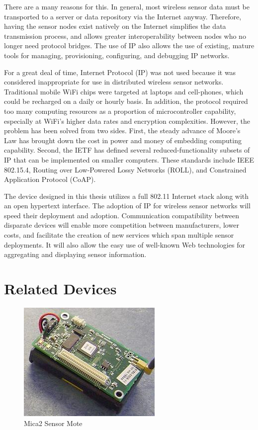 There are a many reasons for this. In general, most wireless sensor data must be transported to a server or data repository via the Internet anyway. Therefore, having the sensor nodes exist natively on the Internet simplifies the data transmission process, and allows greater interoperability between nodes who no longer need protocol bridges. The use of IP also allows the use of existing, mature tools for managing, provisioning, configuring, and debugging IP networks.  

For a great deal of time, Internet Protocol (IP) was not used because it was considered inappropriate for use in distributed wireless sensor networks. Traditional mobile WiFi chips were targeted at laptops and cell-phones, which could be recharged on a daily or hourly basis. In addition, the protocol required too many computing resources as a proportion of microcontroller capability, especially at WiFi's higher data rates and encryption complexities. However, the problem has been solved from two sides. First, the steady advance of Moore's Law has brought down the cost in power and money of embedding computing capability. Second, the IETF has defined several reduced-functionality subsets of IP that can be implemented on smaller computers. These standards include IEEE 802.15.4, Routing over Low-Powered Lossy Networks (ROLL), and Constrained Application Protocol (CoAP). 

The device designed in this thesis utilizes a full 802.11 Internet stack along with an open hypertext interface. The adoption of IP for wireless sensor networks will speed their deployment and adoption. Communication compatibility between disparate devices will enable more competition between manufacturers, lower costs, and facilitate the creation of new services which span multiple sensor deployments. It will also allow the easy use of well-known Web technologies for aggregating and displaying sensor information.

\section{Related Devices}

\begin{figure}[h]
\includegraphics{images/mica2mote}
\caption{Mica2 Sensor Mote\cite{mica2mote_img}}
\label{mica2}
\end{figure}

